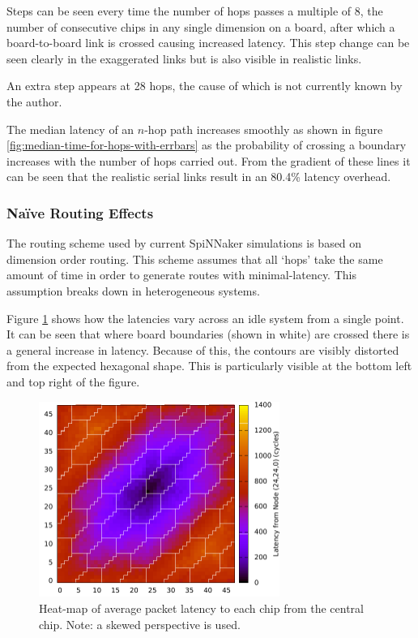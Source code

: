 				Steps can be seen every time the number of hops passes a multiple of 8,
				the number of consecutive chips in any single dimension on a board,
				after which a board-to-board link is crossed causing increased latency.
				This step change can be seen clearly in the exaggerated links but is
				also visible in realistic links.
				
				An extra step appears at 28 hops, the cause of which is not currently
				known by the author.
				
				
				The median latency of an $n$-hop path increases smoothly as shown in
				figure \ref{fig:median-time-for-hops-with-errbars} as the probability of
				crossing a boundary increases with the number of hops carried out. From
				the gradient of these lines it can be seen that the realistic serial links
				result in an 80.4\% latency overhead.
			
			\subsubsection{Na\"ive Routing Effects}
				
				The routing scheme used by current SpiNNaker simulations is based on
				dimension order routing. This scheme assumes that all `hops' take the
				same amount of time in order to generate routes with minimal-latency.
				This assumption breaks down in heterogeneous systems.
				
				Figure \ref{fig:packet-latency-unloaded} shows how the latencies vary
				across an idle system from a single point. It can be seen that where board
				boundaries (shown in white) are crossed there is a general increase in
				latency. Because of this, the contours are visibly distorted from the
				expected hexagonal shape. This is particularly visible at the bottom left
				and top right of the figure.
				
				\begin{figure}
					\centering
					\includegraphics[width=0.7\textwidth]{figures/packet-latency-unloaded.pdf}
					
					\caption[Heat-map of average packet latency.]{Heat-map of average
					packet latency to each chip from the central chip. Note: a skewed
					perspective is used.}
					
					\label{fig:packet-latency-unloaded}
				\end{figure}
				
